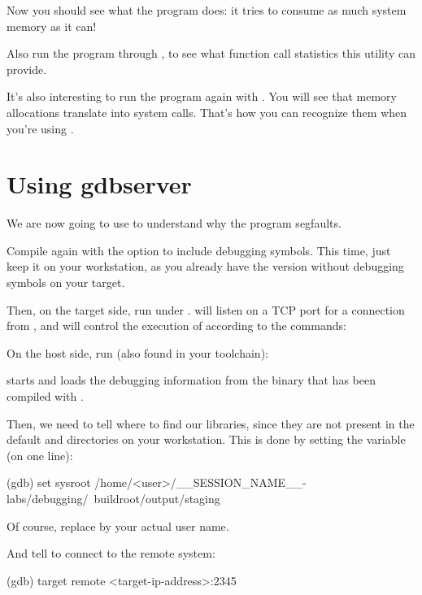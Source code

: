 Now you should see what the program does: it tries to consume as much
system memory as it can!

Also run the program through , to see what function call
statistics this utility can provide.

It's also interesting to run the program again with . You
will see that memory allocations translate into  system
calls. That's how you can recognize them when you're using
.

\section{Using gdbserver}

We are now going to use  to understand why the program
segfaults.

Compile  again with the  option to
include debugging symbols. This time, just keep it on your workstation,
as you already have the version without debugging symbols on your target.

Then, on the target side, run  under
.  will listen on a TCP port for a
connection from , and will control the execution of
 according to the  commands:


On the host side, run  (also found in your toolchain):

 starts and loads the debugging information from the
 binary that has been compiled with .

Then, we need to tell where to find our libraries, since they are not
present in the default  and  directories on
your workstation. This is done by setting the  
variable (on one line):

\begin{bashinput}
(gdb) set sysroot /home/<user>/__SESSION_NAME__-labs/debugging/\
    buildroot/output/staging
\end{bashinput}

Of course, replace  by your actual user name.

And tell  to connect to the remote system:
\begin{bashinput}
(gdb) target remote <target-ip-address>:2345
\end{bashinput}

